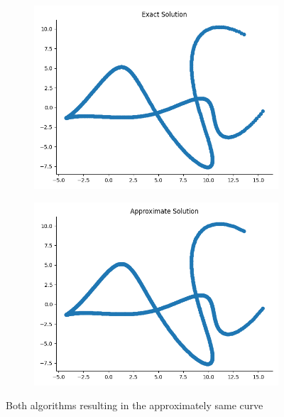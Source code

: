 \begin{figure}[H]
\centering
\begin{subfigure}{.5\textwidth}
  \centering
  \includegraphics[width=\linewidth]{Comp_Exact.png}
\end{subfigure}%
\begin{subfigure}{.5\textwidth}
  \centering
  \includegraphics[width=\linewidth]{Comp_Approx.png}
\end{subfigure}
\caption{Both algorithms resulting in the approximately same curve}
\label{fig:test}
\end{figure}

